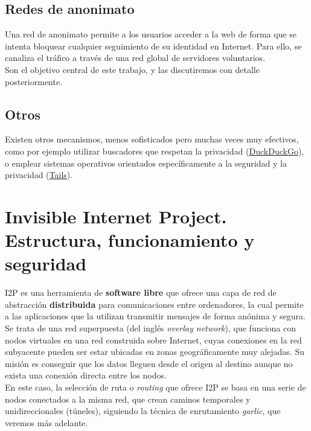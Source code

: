 \subsection{Redes de anonimato} 

Una red de anonimato permite a los usuarios acceder a la web de forma que se intenta bloquear cualquier seguimiento de su identidad en Internet. Para ello, se canaliza el tráfico a través de una red global de servidores voluntarios.\\

Son el objetivo central de este trabajo, y las discutiremos con detalle posteriormente.

\subsection{Otros} Existen otros mecanismos, menos sofisticados pero muchas veces muy efectivos, como por ejemplo utilizar buscadores que respetan la privacidad (\href{https://duckduckgo.com/}{\url{DuckDuckGo}}), o emplear sistemas operativos orientados específicamente a la seguridad y la privacidad (\href{https://tails.boum.org/}{\url{Tails}}).




    \section{Invisible Internet Project. Estructura, funcionamiento y seguridad}

I2P es una herramienta de \textbf{software libre} que ofrece una capa de red de abstracción  \textbf{distribuida} para comunicaciones entre ordenadores, la cual permite a las aplicaciones que la utilizan transmitir mensajes de forma anónima y segura. Se trata de una red superpuesta (del inglés \textit{overlay network}), que funciona con nodos virtuales en una red construida sobre Internet, cuyas conexiones en la red subyacente pueden ser estar ubicadas en zonas geográficamente muy alejadas. Su misión es conseguir que los datos lleguen desde el origen al destino aunque no exista una conexión directa entre los nodos.\\

En este caso, la selección de ruta o \textit{routing} que ofrece I2P se basa en una serie de nodos conectados a la misma red, que crean caminos temporales y unidireccionales (túneles), siguiendo la técnica de enrutamiento \textit{garlic}, que veremos más adelante.\\

